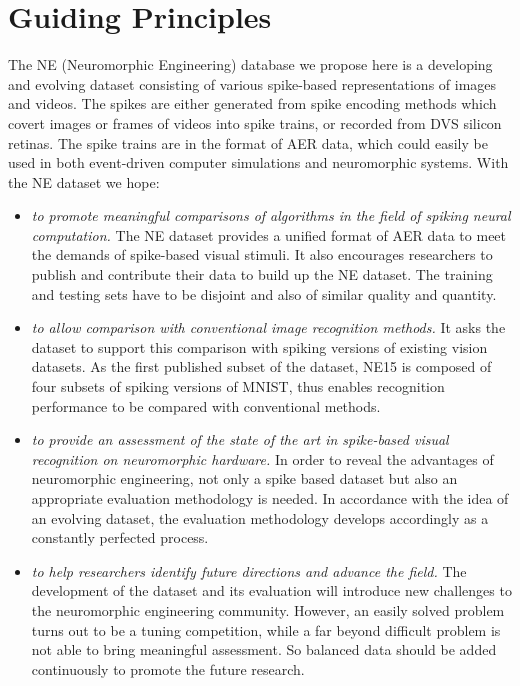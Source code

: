 \section{Guiding Principles}
\label{sec:guide}
The NE (Neuromorphic Engineering) database we propose here is a developing and evolving dataset consisting of various spike-based representations of images and videos.
The spikes are either generated from spike encoding methods which covert images or frames of videos into spike trains, or recorded from DVS silicon retinas.
The spike trains are in the format of AER data, which could easily be used in both event-driven computer simulations and neuromorphic systems.
With the NE dataset we hope:
\begin{itemize}
	\item \textit{to promote meaningful comparisons of algorithms in the field of spiking neural computation.}
	The NE dataset provides a unified format of AER data to meet the demands of spike-based visual stimuli.
	It also encourages researchers to publish and contribute their data to build up the NE dataset.
	The training and testing sets have to be disjoint and also of similar quality and quantity.
	\item \textit{to allow comparison with conventional image recognition methods.}
	It asks the dataset to support this comparison with spiking versions of existing vision datasets.
	As the first published subset of the dataset, NE15 is composed of four subsets of spiking versions of MNIST, thus enables recognition performance to be compared with conventional methods. 
	\item \textit{to provide an assessment of the state of the art in spike-based visual recognition on neuromorphic hardware.}
	In order to reveal the advantages of neuromorphic engineering, not only a spike based dataset but also an appropriate evaluation methodology is needed.
	In accordance with the idea of an evolving dataset, the evaluation methodology develops accordingly as a constantly perfected process.
	\item \textit{to help researchers identify future directions and advance the field.}
	The development of the dataset and its evaluation will introduce new challenges to the neuromorphic engineering community.
	However, an easily solved problem turns out to be a tuning competition, while a far beyond difficult problem is not able to bring meaningful assessment.
	So balanced data should be added continuously to promote the future research.  
\end{itemize}
